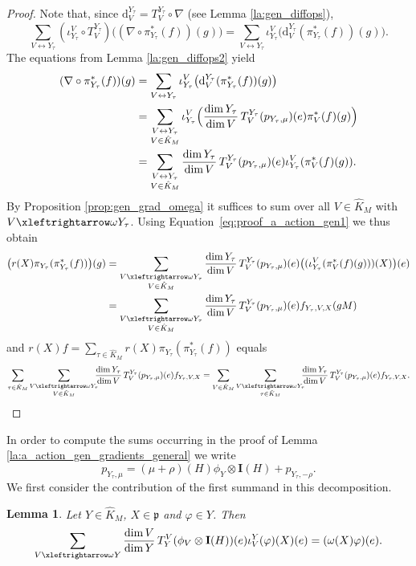 \documentclass[JEP,XML,SOM,NoFloatCountersInSection,Unicode,published]{cedram}
\newtheorem{lemma}[theorem]{Lemma}
\theoremstyle{definition}
\newcommand{\lraomega}{\ensuremath{\xleftrightarrow\omega}}
\newcommand{\mf}[1]{\ensuremath{\mathfrak{#1}}}
\newcommand{\rhoa}{\ensuremath{\rho}}
\newcommand{\I}{\ensuremath{\mathbf{I}}}
\begin{document}
\begin{proof}
Note that, since $\mathrm{d}^{Y_{\tau}}_V=T^{Y_\tau}_V\circ\nabla$ (see Lemma \ref{la:gen_diffops}),
\[
\sum_{V\leftrightarrow Y_\tau}(\iota^V_{Y_{\tau}}\circ T^{Y_{\tau}}_V) \bigl((\nabla\circ\pi_{Y_\tau}^*(f))(g) \bigr)=\sum_{V\leftrightarrow Y_\tau}\iota^V_{Y_{\tau}} \bigl(\mathrm{d}^{Y_{\tau}}_V(\pi_{Y_\tau}^*(f))(g) \bigr).
\]
The equations from Lemma \ref{la:gen_diffops2} yield
\begin{align*}
(\nabla\circ\pi_{Y_\tau}^*(f))(g)&=\sum_{V\leftrightarrow Y_\tau}\iota^V_{Y_{\tau}} \bigl(\mathrm{d}^{Y_{\tau}}_V(\pi_{Y_\tau}^*(f))(g) \bigr)\\
&=\sum_{\substack{V\leftrightarrow Y_\tau\\V\in\hat K_M}}\iota^V_{Y_{\tau}} \Bigl(\frac{\dim Y_\tau}{\dim V}\,T_V^{Y_\tau}(p_{Y_\tau,\mu})(e)\pi_{V}^*(f)(g) \Bigr)\\
&=\sum_{\substack{V\leftrightarrow Y_\tau\\V\in\hat K_M}}\frac{\dim Y_\tau}{\dim V}\,T_V^{Y_\tau}(p_{Y_\tau,\mu})(e)\iota^V_{Y_{\tau}}(\pi_{V}^*(f)(g)).
\end{align*}
By Proposition \ref{prop:gen_grad_omega} it suffices to sum over all $V\in\hat K_M$ with $V\lraomega Y_\tau$.
Using Equation~\eqref{eq:proof_a_action_gen1} we thus obtain
\begin{align*}
\bigl(r(X)\pi_{Y_\tau}(\pi_{Y_\tau}^*(f)) \bigr)(g)&=\sum_{\substack{V\lraomega Y_\tau\\V\in\hat K_M}}\frac{\dim Y_\tau}{\dim V}\,T_V^{Y_\tau}(p_{Y_\tau,\mu})(e) \bigl((\iota^V_{Y_{\tau}}(\pi_{V}^*(f)(g)))(X) \bigr)(e)\\
&=\sum_{\substack{V\lraomega Y_\tau\\V\in\hat K_M}}\frac{\dim Y_\tau}{\dim V}\,T_V^{Y_\tau}(p_{Y_\tau,\mu})(e)f_{Y_\tau,V,X}(gM)
\end{align*}
and $r(X)f=\sum_{\tau\in\hat K_M}r(X)\pi_{Y_\tau}(\pi_{Y_\tau}^*(f))$ equals
\[
\sum_{\tau\in\hat K_M}\sum_{\substack{V\lraomega Y_\tau\\V\in\hat K_M}}\hspace*{-2mm}\frac{\dim Y_\tau}{\dim V}\,T_V^{Y_\tau}(p_{Y_\tau,\mu})(e)f_{Y_\tau,V,X}=\sum_{V\in\hat K_M}\sum_{\substack{V\lraomega Y_\tau\\\tau\in\hat K_M}}\hspace*{-2mm}\frac{\dim Y_\tau}{\dim V}\,T_V^{Y_\tau}(p_{Y_\tau,\mu})(e)f_{Y_\tau,V,X}.\qedhere
\]
\end{proof}

In order to compute the sums occurring in the proof of Lemma \ref{la:a_action_gen_gradients_general} we write
\begin{equation}\label{eq:decomp_p}
p_{Y_\tau,\mu}=(\mu+\rhoa)(H)\phi_Y\otimes\I(H)+p_{Y_\tau,-\rhoa}.
\end{equation}
We first consider the contribution of the first summand in this decomposition.
\begin{lemma}\label{la:p_first_part}
Let $Y\in\hat K_M$, $X\in\mf p$ and $\varphi\in Y$. Then
\[
\sum_{V\lraomega Y}\frac{\dim V}{\dim Y}\,T_{Y}^V(\phi_V\otimes\I(H))(e)\iota_V^{Y}(\varphi)(X)(e)=(\omega(X)\varphi)(e).
\]
\end{lemma}
\end{document}
